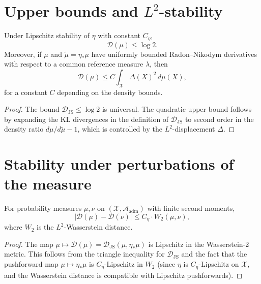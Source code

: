\documentclass[12pt, oneside]{memoir}
\newcommand{\X}{\mathcal{X}}
\newcommand{\Aadm}{\mathcal{A}_{\mathrm{adm}}}
\newcommand{\Djs}{\mathcal{D}_{\mathrm{JS}}}
\begin{document}
\section{Upper bounds and $L^2$-stability}

\begin{proposition}
\label{prop:upper-bound}
Under Lipschitz stability of $\eta$ with constant $C_\eta$,
\[
  \mathcal{D}(\mu) \le \log 2.
\]
Moreover, if $\mu$ and $\tilde\mu = \eta_*\mu$ have uniformly bounded Radon--Nikodym
derivatives with respect to a common reference measure $\lambda$, then
\[
  \mathcal{D}(\mu) \le C \int_\X \Delta(X)^2\, d\mu(X),
\]
for a constant $C$ depending on the density bounds.
\end{proposition}

\begin{proof}
The bound $\Djs \le \log 2$ is universal.  The quadratic upper bound follows by expanding
the KL divergences in the definition of $\Djs$ to second order in the density ratio
$d\mu/d\tilde\mu - 1$, which is controlled by the $L^2$-displacement $\Delta$.
\end{proof}

\section{Stability under perturbations of the measure}

\begin{proposition}
\label{prop:wasserstein-stab}
For probability measures $\mu, \nu$ on $(\X, \Aadm)$ with finite second moments,
\[
  |\mathcal{D}(\mu) - \mathcal{D}(\nu)| \le C_\eta \cdot W_2(\mu, \nu),
\]
where $W_2$ is the $L^2$-Wasserstein distance.
\end{proposition}

\begin{proof}
The map $\mu \mapsto \mathcal{D}(\mu) = \Djs(\mu, \eta_*\mu)$ is Lipschitz in the
Wasserstein-2 metric.  This follows from the triangle inequality for $\Djs$ and the fact
that the pushforward map $\mu \mapsto \eta_*\mu$ is $C_\eta$-Lipschitz in $W_2$ (since
$\eta$ is $C_\eta$-Lipschitz on $\X$, and the Wasserstein distance is compatible with
Lipschitz pushforwards).
\end{proof}
\end{document}
